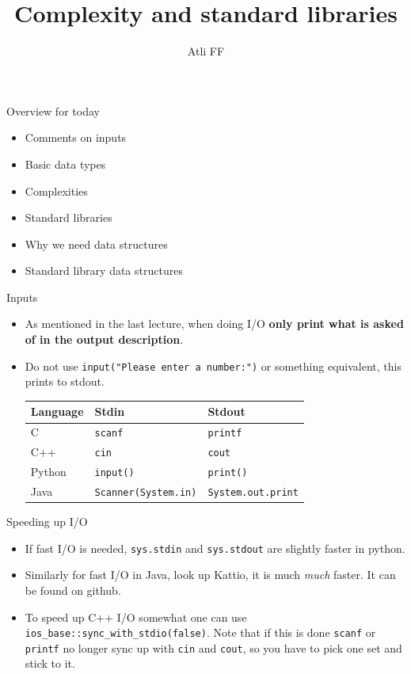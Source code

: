 \documentclass{beamer}
\title{Complexity and standard libraries}
\author{Atli FF}
\institute{\href{http://ru.is/td}{School of Computer Science} \\[2pt] \href{http://ru.is}{Reykjavík University}}
\begin{document}
\maketitle


\begin{frame}[plain]{Overview for today}
    \vspace{20pt}
    \begin{itemize}
        \item Comments on inputs
        \item Basic data types
        \item Complexities
        \item Standard libraries
        \item Why we need data structures
        \item Standard library data structures
    \end{itemize}
\end{frame}

\begin{frame}[plain]{Inputs}
    \begin{itemize}
        \item As mentioned in the last lecture, when doing I/O \textbf{only print what is asked of in the output description}.
        \item Do not use \texttt{input("Please enter a number:")} or something equivalent, this prints to stdout.
        \vspace{15pt}
        \begin{tabular}{l|l|l}
            Language & Stdin & Stdout \\ \hline
            C & \texttt{scanf} & \texttt{printf} \\
            C++ & \texttt{cin} & \texttt{cout} \\
            Python & \texttt{input()} & \texttt{print()} \\
            Java & \texttt{Scanner(System.in)} & \texttt{System.out.print} \\
        \end{tabular}
    \end{itemize}
\end{frame}

\begin{frame}[plain]{Speeding up I/O}
    \begin{itemize}
        \item If fast I/O is needed, \texttt{sys.stdin} and \texttt{sys.stdout} are slightly faster in python.
        \item Similarly for fast I/O in Java, look up Kattio, it is much \textit{much} faster. It can be found on github.
        \item To speed up C++ I/O somewhat one can use \texttt{ios\_{}base::sync\_{}with\_{}stdio(false)}. Note that if this is done \texttt{scanf} or \texttt{printf} no longer sync up with \texttt{cin} and \texttt{cout}, so you have to pick one set and stick to it.
    \end{itemize}
\end{frame}
\end{document}
